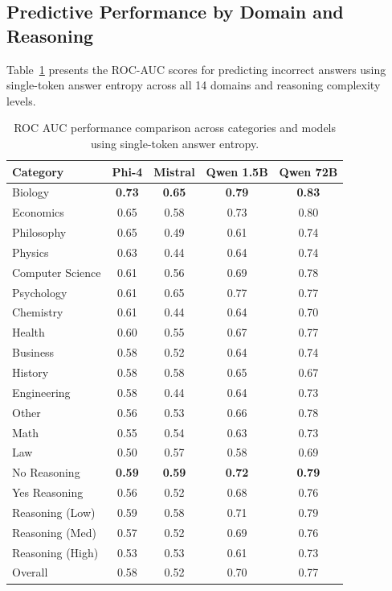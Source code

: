 \subsection{Predictive Performance by Domain and Reasoning}

Table~\ref{tab:entropy_results} presents the ROC-AUC scores for predicting incorrect answers using single-token answer entropy across all 14 domains and reasoning complexity levels.

\begin{table}[!htb]
\centering
\caption{ROC AUC performance comparison across categories and models using single-token answer entropy.}
\renewcommand{\arraystretch}{1.2}
\begin{tabular}{lcccc}
\toprule
Category & Phi-4 & Mistral & Qwen 1.5B & Qwen 72B \\
\midrule
Biology & \textbf{0.73} & \textbf{0.65} & \textbf{0.79} & \textbf{0.83} \\
Economics & 0.65 & 0.58 & 0.73 & 0.80 \\
Philosophy & 0.65 & 0.49 & 0.61 & 0.74 \\
Physics & 0.63 & 0.44 & 0.64 & 0.74 \\
Computer Science & 0.61 & 0.56 & 0.69 & 0.78 \\
Psychology & 0.61 & 0.65 & 0.77 & 0.77 \\
Chemistry & 0.61 & 0.44 & 0.64 & 0.70 \\
Health & 0.60 & 0.55 & 0.67 & 0.77 \\
Business & 0.58 & 0.52 & 0.64 & 0.74 \\
History & 0.58 & 0.58 & 0.65 & 0.67 \\
Engineering & 0.58 & 0.44 & 0.64 & 0.73 \\
Other & 0.56 & 0.53 & 0.66 & 0.78 \\
Math & 0.55 & 0.54 & 0.63 & 0.73 \\
Law & 0.50 & 0.57 & 0.58 & 0.69 \\
\midrule
No Reasoning & \textbf{0.59} & \textbf{0.59} & \textbf{0.72} & \textbf{0.79} \\
Yes Reasoning & 0.56 & 0.52 & 0.68 & 0.76 \\
Reasoning (Low) & 0.59 & 0.58 & 0.71 & 0.79 \\
Reasoning (Med) & 0.57 & 0.52 & 0.69 & 0.76 \\
Reasoning (High) & 0.53 & 0.53 & 0.61 & 0.73 \\
\midrule
Overall & 0.58 & 0.52 & 0.70 & 0.77 \\
\bottomrule
\end{tabular}
\label{tab:entropy_results}
\end{table}

